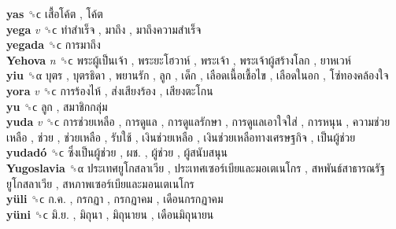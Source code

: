 \textbf{yas} ␝ϲ   เสื้อโค้ต ,  โค้ต   \\
\textbf{yega} \emph{v}  ␝ϲ   ทำสำเร็จ ,  มาถึง ,  มาถึงความสำเร็จ   \\
\textbf{yegada} ␝ϲ   การมาถึง   \\
\textbf{Yehova} \emph{n}  ␝ϲ   พระผู้เป็นเจ้า ,  พระยะโฮวาห์ ,  พระเจ้า ,  พระเจ้าผู้สร้างโลก ,  ยาหเวห์   \\
\textbf{yiu} ␝α   บุตร ,  บุตรธิดา ,  พยานรัก ,  ลูก ,  เด็ก ,  เลือดเนื้อเชื้อไข ,  เลือดในอก ,  โซ่ทองคล้องใจ   \\
\textbf{yora} \emph{v}  ␝ϲ   การร้องไห้ ,  ส่งเสียงร้อง ,  เสียงตะโกน   \\
\textbf{yu} ␝ϲ   ลูก ,  สมาชิกกลุ่ม   \\
\textbf{yuda} \emph{v}  ␝ϲ   การช่วยเหลือ ,  การดูแล ,  การดูแลรักษา ,  การดูแลเอาใจใส่ ,  การหนุน ,  ความช่วยเหลือ ,  ช่วย ,  ช่วยเหลือ ,  รับใช้ ,  เงินช่วยเหลือ ,  เงินช่วยเหลือทางเศรษฐกิจ ,  เป็นผู้ช่วย   \\
\textbf{yudadó} ␝ϲ   ซึ่งเป็นผู้ช่วย ,  ผช. ,  ผู้ช่วย ,  ผู้สนับสนุน   \\
\textbf{Yugoslavia} ␝α   ประเทศยูโกสลาเวีย ,  ประเทศเซอร์เบียและมอเตเนโกร ,  สหพันธ์สาธารณรัฐยูโกสลาเวีย ,  สหภาพเซอร์เบียและมอนเตเนโกร   \\
\textbf{yüli} ␝ϲ   ก.ค. ,  กรกฏา ,  กรกฏาคม ,  เดือนกรกฏาคม   \\
\textbf{yüni} ␝ϲ   มิ.ย. ,  มิถุนา ,  มิถุนายน ,  เดือนมิถุนายน   \\
